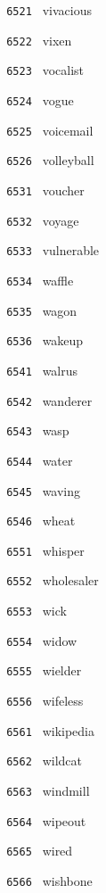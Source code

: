 \documentclass[11pt]{article}
\begin{document}
\begin{multicols}{6}
\vspace{3mm}
\noindent \texttt{ 6521 } vivacious  \par
\noindent \texttt{ 6522 } vixen  \par
\noindent \texttt{ 6523 } vocalist  \par
\noindent \texttt{ 6524 } vogue  \par
\noindent \texttt{ 6525 } voicemail  \par
\noindent \texttt{ 6526 } volleyball  \par
\vspace{3mm}
\noindent \texttt{ 6531 } voucher  \par
\noindent \texttt{ 6532 } voyage  \par
\noindent \texttt{ 6533 } vulnerable  \par
\noindent \texttt{ 6534 } waffle  \par
\noindent \texttt{ 6535 } wagon  \par
\noindent \texttt{ 6536 } wakeup  \par
\vspace{3mm}
\noindent \texttt{ 6541 } walrus  \par
\noindent \texttt{ 6542 } wanderer  \par
\noindent \texttt{ 6543 } wasp  \par
\noindent \texttt{ 6544 } water  \par
\noindent \texttt{ 6545 } waving  \par
\noindent \texttt{ 6546 } wheat  \par
\vspace{3mm}
\noindent \texttt{ 6551 } whisper  \par
\noindent \texttt{ 6552 } wholesaler  \par
\noindent \texttt{ 6553 } wick  \par
\noindent \texttt{ 6554 } widow  \par
\noindent \texttt{ 6555 } wielder  \par
\noindent \texttt{ 6556 } wifeless  \par
\vspace{3mm}
\noindent \texttt{ 6561 } wikipedia  \par
\noindent \texttt{ 6562 } wildcat  \par
\noindent \texttt{ 6563 } windmill  \par
\noindent \texttt{ 6564 } wipeout  \par
\noindent \texttt{ 6565 } wired  \par
\noindent \texttt{ 6566 } wishbone  \par

\end{multicols}
\end{document}
